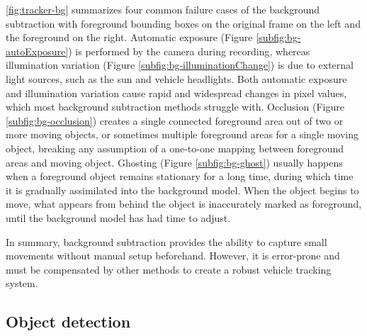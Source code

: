 \ref{fig:tracker-bg} summarizes four common failure cases of the background subtraction with foreground bounding boxes on the original frame on the left and the foreground on the right. Automatic exposure (Figure \ref{subfig:bg-autoExposure}) is performed by the camera during recording, whereas illumination variation (Figure \ref{subfig:bg-illuminationChange}) is due to external light sources, such as the sun and vehicle headlights.
Both automatic exposure and illumination variation cause rapid and widespread changes in pixel values, which most background subtraction methods struggle with. 
Occlusion (Figure \ref{subfig:bg-occlusion}) creates a single connected foreground area out of two or more moving objects, or sometimes multiple foreground areas for a single moving object, breaking any assumption of a one-to-one mapping between foreground areas and moving object.
Ghosting (Figure \ref{subfig:bg-ghost}) usually happens when a foreground object remains stationary for a long time, during which time it is gradually assimilated into the background model.
When the object begins to move, what appears from behind the object is inaccurately marked as foreground, until the background model has had time to adjust.


In summary, background subtraction provides the ability to capture small movements without manual setup beforehand. However, it is error-prone and must be compensated by other methods to create a robust vehicle tracking system. 

\subsection{Object detection}
\label{subsection:detector}

